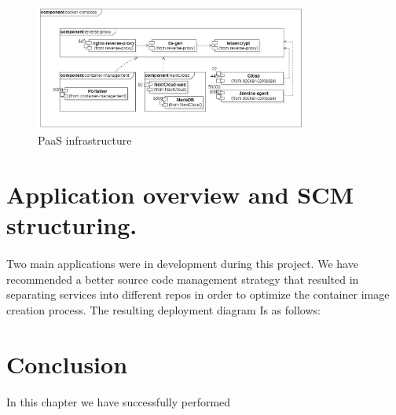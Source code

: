  \begin{figure}[!ht]\centering
\includegraphics[width=0.8\textwidth,angle=00]{assets/f9.jpg}
\caption{PaaS infrastructure}
\label{fig:f9}
\end{figure}

\section{Application overview and SCM structuring.}

\paragraph{}
Two main applications were in development during this project. We have recommended a better source code management strategy that resulted in separating services into different repos in order to optimize the container image creation process. The resulting deployment diagram Is as follows:
 
\section*{Conclusion}
\paragraph{}In this chapter we have successfully performed



